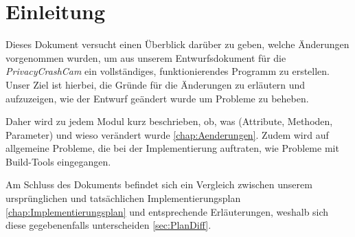 \chapter{Einleitung} \label{chap:Einleitung}
Dieses Dokument versucht einen Überblick darüber zu geben, welche Änderungen vorgenommen wurden, um aus unserem Entwurfsdokument für die \textit{PrivacyCrashCam} ein vollständiges, funktionierendes Programm zu erstellen. Unser Ziel ist hierbei, die Gründe für die Änderungen zu erläutern und aufzuzeigen, wie der Entwurf geändert wurde um Probleme zu beheben.\par
Daher wird zu jedem Modul kurz beschrieben, ob, was (Attribute, Methoden, Parameter) und wieso verändert wurde \eqref{chap:Aenderungen}. Zudem wird auf allgemeine Probleme, die bei der Implementierung auftraten, wie Probleme mit Build-Tools eingegangen.\par
Am Schluss des Dokuments befindet sich ein Vergleich zwischen unserem ursprünglichen und tatsächlichen Implementierungsplan \eqref{chap:Implementierungsplan} und entsprechende Erläuterungen, weshalb sich diese gegebenenfalls unterscheiden \eqref{sec:PlanDiff}.